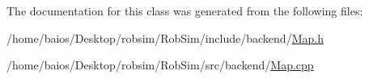 The documentation for this class was generated from the following files\-:\begin{DoxyCompactItemize}
\item 
/home/baios/\-Desktop/robsim/\-Rob\-Sim/include/backend/\hyperlink{_map_8h}{Map.\-h}\item 
/home/baios/\-Desktop/robsim/\-Rob\-Sim/src/backend/\hyperlink{_map_8cpp}{Map.\-cpp}\end{DoxyCompactItemize}
